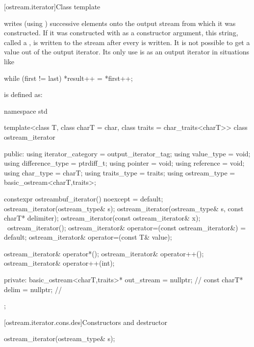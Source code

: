 \begin{itemdescr}
\pnum
\returns
{}
\end{itemdescr}

[ostream.iterator]{Class template }

\pnum
{}%
writes (using
)
successive elements onto the output stream from which it was constructed.
If it was constructed with
as a constructor argument, this string, called a
,
is written to the stream after every
is written.
It is not possible to get a value out of the output iterator.
Its only use is as an output iterator in situations like

\begin{codeblock}
while (first != last)
  *result++ = *first++;
\end{codeblock}

\pnum
{}
is defined as:

\begin{codeblock}
namespace std {
  template<class T, class charT = char, class traits = char_traits<charT>>
  class ostream_iterator {
  public:
    using iterator_category = output_iterator_tag;
    using value_type        = void;
    using difference_type   = ptrdiff_t;
    using pointer           = void;
    using reference         = void;
    using char_type         = charT;
    using traits_type       = traits;
    using ostream_type      = basic_ostream<charT,traits>;

    constexpr ostreambuf_iterator() noexcept = default;
    ostream_iterator(ostream_type& s);
    ostream_iterator(ostream_type& s, const charT* delimiter);
    ostream_iterator(const ostream_iterator& x);
    ~ostream_iterator();
    ostream_iterator& operator=(const ostream_iterator&) = default;
    ostream_iterator& operator=(const T& value);

    ostream_iterator& operator*();
    ostream_iterator& operator++();
    ostream_iterator& operator++(int);

  private:
    basic_ostream<charT,traits>* out_stream = nullptr;          // \expos
    const charT* delim = nullptr;                               // \expos
  };
}
\end{codeblock}

[ostream.iterator.cons.des]{Constructors and destructor}

%
\begin{itemdecl}
ostream_iterator(ostream_type& s);
\end{itemdecl}

